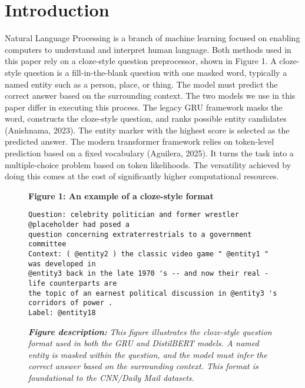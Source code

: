 \documentclass[11pt]{article}
\begin{document}
    \section{Introduction}\label{introduction}

    Natural Language Processing is a branch of machine learning focused on
enabling computers to understand and interpret human language. Both
methods used in this paper rely on a cloze-style question preprocessor,
shown in Figure 1. A cloze-style question is a fill-in-the-blank
question with one masked word, typically a named entity such as a
person, place, or thing. The model must predict the correct answer based
on the surrounding context. The two models we use in this paper differ
in executing this process. The legacy GRU framework masks the word,
constructs the cloze-style question, and ranks possible entity
candidates (Anishnama, 2023). The entity marker with the highest score
is selected as the predicted answer. The modern transformer framework
relies on token-level prediction based on a fixed vocabulary (Aguilera,
2025). It turns the task into a multiple-choice problem based on token
likelihoods. The versatility achieved by doing this comes at the cost of
significantly higher computational resources.

\begin{figure}
\begin{samepage}
	\begin{center}
		\textbf{Figure 1: An example of a cloze-style format}
	\end{center}
    \begin{Verbatim}[commandchars=\\\{\}]
Question: celebrity politician and former wrestler @placeholder had posed a
question concerning extraterrestrials to a government committee
Context: ( @entity2 ) the classic video game " @entity1 " was developed in
@entity3 back in the late 1970 's -- and now their real - life counterparts are
the topic of an earnest political discussion in @entity3 's corridors of power .
Label: @entity18
    \end{Verbatim}
    \vspace{1em}
\noindent\begin{minipage}{0.9\linewidth}
\begin{scriptsize}
\textbf{\textit{Figure description:}} \textit{This figure illustrates the cloze-style question format used in both the GRU and DistilBERT models. A named entity is masked within the question, and the model must infer the correct answer based on the surrounding context. This format is foundational to the CNN/Daily Mail datasets.}
\end{scriptsize}
\end{minipage}
\end{samepage}
\end{figure}
\end{document}
